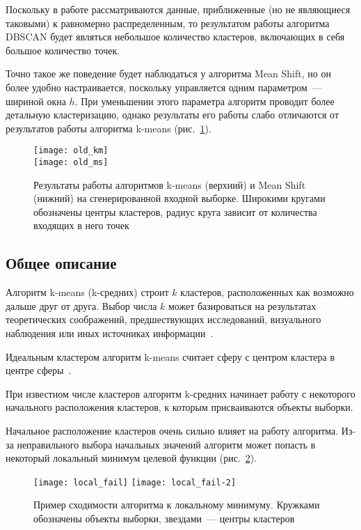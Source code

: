 Поскольку в работе рассматриваются данные, приближенные (но не являющиеся таковыми) к равномерно распределенным, то результатом работы алгоритма DBSCAN будет являться небольшое количество кластеров, включающих в себя большое количество точек.

Точно такое же поведение будет наблюдаться у алгоритма Mean Shift, но он более удобно настраивается, поскольку управляется одним параметром~--- шириной окна \( h \). При уменьшении этого параметра алгоритм проводит более детальную кластеризацию, однако результаты его работы слабо отличаются от результатов работы алгоритма k-means (рис.~\ref{pic:oldkm-ms}).
\begin{figure}[t!]
    \centering
    \texttt{[image: old\_km]}\\[.5ex]
    \texttt{[image: old\_ms]}\\[1ex]
    \parbox{.9\textwidth}{\caption{Результаты работы алгоритмов k-means (верхний) и Mean Shift (нижний) на сгенерированной входной выборке. Широкими кругами обозначены центры кластеров, радиус круга зависит от количества входящих в него точек}\label{pic:oldkm-ms}}
\end{figure}

\subsection{Общее описание}
Алгоритм k-means (k-средних) строит \( k \) кластеров, расположенных как возможно дальше друг от друга. Выбор числа \( k \) может базироваться на результатах теоретических соображений, предшествующих исследований, визуального наблюдения или иных источниках информации~\cite{neiskiy}.

Идеальным кластером алгоритм k-means считает сферу с центром кластера в центре сферы~\cite{dbscan-pos}.

При известном числе кластеров алгоритм k-средних начинает работу с некоторого начального расположения кластеров, к которым присваиваются объекты выборки.

Начальное расположение кластеров очень сильно влияет на работу алгоритма. Из-за неправильного выбора начальных значений алгоритм может попасть в некоторый локальный минимум целевой функции (рис.~\ref{pic:local_fail}).

\begin{figure}[ht!]
    \centering
    \texttt{[image: local\_fail]} \hspace{1em}
    \texttt{[image: local\_fail-2]} \\[1ex]
    \parbox{.9\textwidth}{\caption{Пример сходимости алгоритма к локальному минимуму. Кружками обозначены объекты выборки, звездами~--- центры кластеров} \label{pic:local_fail}}
\end{figure}

